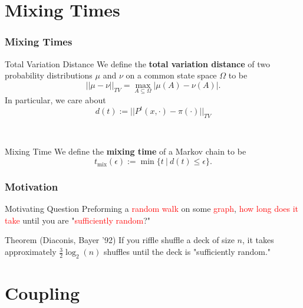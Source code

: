 \documentclass[svgnames,english]{beamer} %
\begin{document}
\section{Mixing Times}

\begin{frame}
\frametitle{Mixing Times}
\begin{block}{Total Variation Distance}
We define the \textbf{total variation distance} of two probability distributions $\mu$ and $\nu$ on a common state space $\Omega$ to be 
\[ ||\mu - \nu||_{TV} = \max_{A \subseteq \Omega} |\mu(A) - \nu(A)|. \]
In particular, we care about
\[ d(t) := ||P^t(x, \cdot) - \pi(\cdot)||_{TV}\]
\end{block} \
\begin{block}{Mixing Time}
We define the \textbf{mixing time} of a Markov chain to be 
\[t_{\text{mix}}(\epsilon) := \min \{t \ | \ d(t) \leq \epsilon \}. \]
\end{block}
\end{frame}

\begin{frame}
\frametitle{Motivation}
\begin{block}{Motivating Question}
Preforming a \textcolor{red}{random walk} on some \textcolor{red}{graph}, \textcolor{red}{how long does it take} until you are "\textcolor{red}{sufficiently random}?"
\end{block} 

\begin{block}{Theorem (Diaconis, Bayer '92)}
If you riffle shuffle a deck of size $n$, it takes approximately $ \frac{3}{2} \log_2(n)$ shuffles until the deck is "sufficiently random."
\end{block}

\end{frame}

\section{Coupling}

\end{document}
